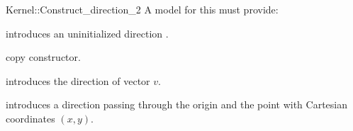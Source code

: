 \begin{ccRefFunctionObjectConcept}{Kernel::Construct_direction_2}
A model for this must provide:



\ccHidden {}
             {introduces an uninitialized direction .}

\ccHidden {}
 	    {copy constructor.}

	    {introduces the direction  of vector $v$.}

            {introduces a direction  passing through the origin
             and the point with Cartesian coordinates $(x, y)$.}

\end{ccRefFunctionObjectConcept}

